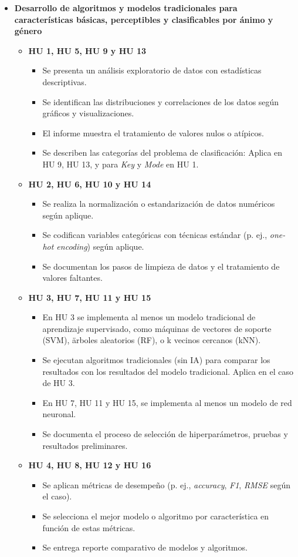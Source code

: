 \documentclass[
11pt, %
]{charter}
\begin{document}
\begin{itemize}
  \item \textbf{Desarrollo de algoritmos y modelos tradicionales para características básicas, perceptibles y clasificables por ánimo y género}
    \begin{itemize}
      \item \textbf{HU 1, HU 5, HU 9 y HU 13}
      \begin{itemize}
        \item Se presenta un análisis exploratorio de datos con estadísticas descriptivas.
        \item Se identifican las distribuciones y correlaciones de los datos según gráficos y visualizaciones.
        \item El informe muestra el tratamiento de valores nulos o atípicos.
        \item Se describen las categorías del problema de clasificación: Aplica en HU 9, HU 13, y para \textit{Key} y \textit{Mode} en HU 1.
      \end{itemize}
      \item \textbf{HU 2, HU 6, HU 10 y HU 14}
      \begin{itemize}
        \item Se realiza la normalización o estandarización de datos numéricos según aplique.
        \item Se codifican variables categóricas con técnicas estándar (p. ej., \textit{one-hot encoding}) según aplique.
        \item Se documentan los pasos de limpieza de datos y el tratamiento de valores faltantes.
      \end{itemize}
      \item \textbf{HU 3, HU 7, HU 11 y HU 15}
      \begin{itemize}
        \item En HU 3 se implementa al menos un modelo tradicional de aprendizaje supervisado, como máquinas de vectores de soporte (SVM), ärboles aleatorios (RF), o k vecinos cercanos (kNN).
        \item Se ejecutan algoritmos tradicionales (sin IA) para comparar los resultados con los resultados del modelo tradicional. Aplica en el caso de HU 3.
        \item En HU 7, HU 11 y HU 15, se implementa al menos un modelo de red neuronal.
        \item Se documenta el proceso de selección de hiperparámetros, pruebas y resultados preliminares.
      \end{itemize}
      \item \textbf{HU 4, HU 8, HU 12 y HU 16}
      \begin{itemize}
        \item Se aplican métricas de desempeño (p. ej., \textit{accuracy}, \textit{F1}, \textit{RMSE} según el caso).
        \item Se selecciona el mejor modelo o algoritmo por característica en función de estas métricas.
        \item Se entrega reporte comparativo de modelos y algoritmos.
      \end{itemize}
    \end{itemize}


\end{itemize}
\end{document}
